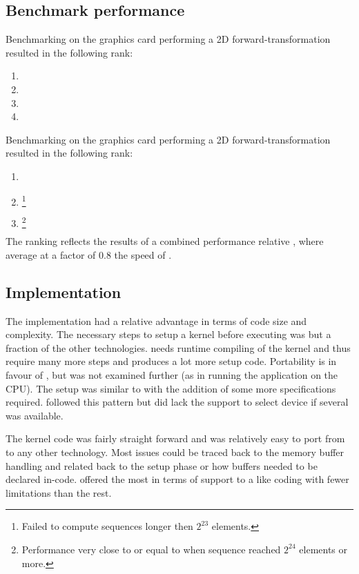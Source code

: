\subsection{Benchmark performance}

Benchmarking on the {\NVCARD} graphics card performing a \gls{2D} forward-transformation resulted in the following rank:
\begin{enumerate}	
	\item {\CU}
	\item {\DX}
	\item {\GL}
	\item {\OCL}
\end{enumerate}

Benchmarking on the {\AMDCARD} graphics card performing a \gls{2D} forward-transformation resulted in the following rank:
\begin{enumerate}	
	\item {\DX}
	\item {\GL}\footnote{Failed to compute sequences longer then $2^{23}$ elements.}
	\item {\OCL}\footnote{Performance very close to or equal to {\DX} when sequence reached $2^{24}$ elements or more.}
\end{enumerate}
The ranking reflects the results of a combined performance relative {\OCL}, where {\DX} average at a factor of $0.8$ the speed of {\OCL}.

\subsection{Implementation}

The {\CU} implementation had a relative advantage in terms of code size and complexity. The necessary steps to setup a kernel before executing was but a fraction of the other technologies. {\OCL} needs runtime compiling of the kernel and thus require many more steps and produces a lot more setup code. Portability is in favour of {\OCL}, but was not examined further (as in running the application on the \gls{CPU}). The {\DX} setup was similar to {\OCL} with the addition of some more specifications required. {\GL} followed this pattern but did lack the support to select device if several was available.

The kernel code was fairly straight forward and was relatively easy to port from {\CU} to any other technology. Most issues could be traced back to the memory buffer handling and related back to the setup phase or how buffers needed to be declared in-code. {\CU} offered the most in terms of support to a {\CPP} like coding with fewer limitations than the rest.

